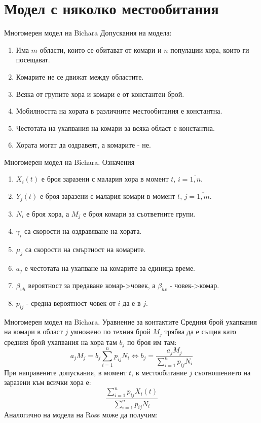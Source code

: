 \section{Модел с няколко местообитания}
\begin{frame}[t]{Многомерен модел на Bichara}
  Допускания на модела:
  \begin{enumerate}
    \item Има $m$ области, които се обитават от комари и $n$ популации хора, които ги посещават.
    \item Комарите не се движат между областите.
    \item Всяка от групите хора и комари е от константен брой.
    \item Мобилността на хората в различните местообитания е константна.
    \item Честотата на ухапвания на комари за всяка област е константна.
    \item Хората могат да оздравеят, а комарите - не.
  \end{enumerate}
\end{frame}

\begin{frame}[t]{Многомерен модел на Bichara. Означения}
  \begin{enumerate}
    \item $X_i(t)$ е броя заразени с малария хора в момент $t$, $i=\overline{1,n}$.
    \item $Y_j(t)$ е броя заразени с малария комари в момент $t$, $j=\overline{1,m}$.
    \item $N_i$ е броя хора, а $M_j$ е броя комари за съответните групи.
    \item $\gamma_i$ са скорости на оздравяване на хората.
    \item $\mu_j$ са скорости на смъртност на комарите.
    \item $a_j$ е честотата на ухапване на комарите за единица време.
    \item $\beta_{vh}$ вероятност за предаване комар->човек, а $\beta_{hv}$ - човек->комар.
    \item $p_{ij}$ - средна вероятност човек от $i$ да е в $j$.
  \end{enumerate}
\end{frame}

\begin{frame}[t]{Многомерен модел на Bichara. Уравнение за контактите}
  Средния брой ухапвания на комари в област $j$ умножено по техния брой $M_j$ трябва да е същия като средния брой ухапвания на хора там $b_j$ по броя им там:
  \begin{equation}
    a_j M_j = b_j \sum_{i=1}^n p_{ij} N_i \iff b_j = \frac{a_j M_j}{\sum_{i=1}^n p_{ij} N_i}
  \end{equation}
  При направените допускания, в момент $t$, в местообитание $j$ съотношението на заразени към всички хора е:
  \begin{equation}
    \frac{\sum_{i=1}^n p_{ij} X_i(t)}{\sum_{i=1}^n p_{ij} N_i}
  \end{equation}
  Аналогично на модела на Ross може да получим:
\end{frame}

